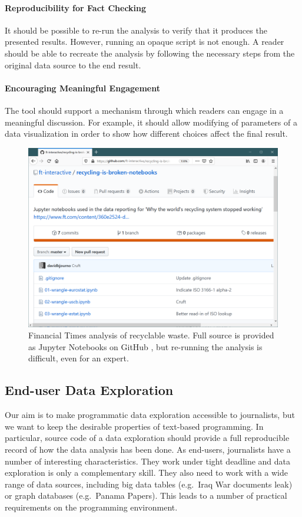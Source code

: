 \documentclass{sigchi}
\begin{document}
\paragraph{Reproducibility for Fact Checking}
It should be possible to re-run the analysis to verify that it produces the presented results.
However, running an opaque script is not enough. A reader should be able to recreate the analysis
by following the necessary steps from the original data source to the end result.

\paragraph{Encouraging Meaningful Engagement}
The tool should support a mechanism through which readers can engage in a meaningful discussion.
For example, it should allow modifying of parameters of a data visualization in order to show
how different choices affect the final result.

\begin{figure}
\includegraphics[width=1\columnwidth]{figures/ft}
\caption{Financial Times analysis of recyclable waste. Full source is provided as Jupyter Notebooks
on GitHub \cite{ftnotebooks}, but re-running the analysis is difficult, even for an expert.}
\label{fig:ft}
\end{figure}

\subsection{End-user Data Exploration}
Our aim is to make programmatic data exploration accessible to journalists, but we want to keep
the desirable properties of text-based programming. In particular, source code of a data
exploration should provide a full reproducible record of how the data analysis has been done.
As end-users, journalists have a number of interesting characteristics. They work under tight
deadline and data exploration is only a complementary skill. They also need to work with a wide
range of data sources, including big data tables (e.g.~Iraq War documents leak) or graph
databases (e.g.~Panama Papers). This leads to a number of practical requirements on the programming
environment.
\end{document}
